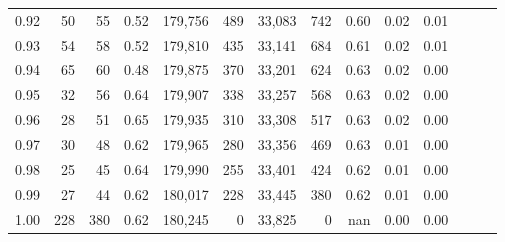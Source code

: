 \begin{tabular}{rrrrrrrrrrrrrr}
0.92 &     50 &   55 &  0.52 &  179,756 &      489 &  33,083 &     742 &  0.60 &  0.02 &      0.01 \\
0.93 &     54 &   58 &  0.52 &  179,810 &      435 &  33,141 &     684 &  0.61 &  0.02 &      0.01 \\
0.94 &     65 &   60 &  0.48 &  179,875 &      370 &  33,201 &     624 &  0.63 &  0.02 &      0.00 \\
0.95 &     32 &   56 &  0.64 &  179,907 &      338 &  33,257 &     568 &  0.63 &  0.02 &      0.00 \\
0.96 &     28 &   51 &  0.65 &  179,935 &      310 &  33,308 &     517 &  0.63 &  0.02 &      0.00 \\
0.97 &     30 &   48 &  0.62 &  179,965 &      280 &  33,356 &     469 &  0.63 &  0.01 &      0.00 \\
0.98 &     25 &   45 &  0.64 &  179,990 &      255 &  33,401 &     424 &  0.62 &  0.01 &      0.00 \\
0.99 &     27 &   44 &  0.62 &  180,017 &      228 &  33,445 &     380 &  0.62 &  0.01 &      0.00 \\
1.00 &    228 &  380 &  0.62 &  180,245 &        0 &  33,825 &       0 &   nan &  0.00 &      0.00 \\
\bottomrule
\end{tabular}
